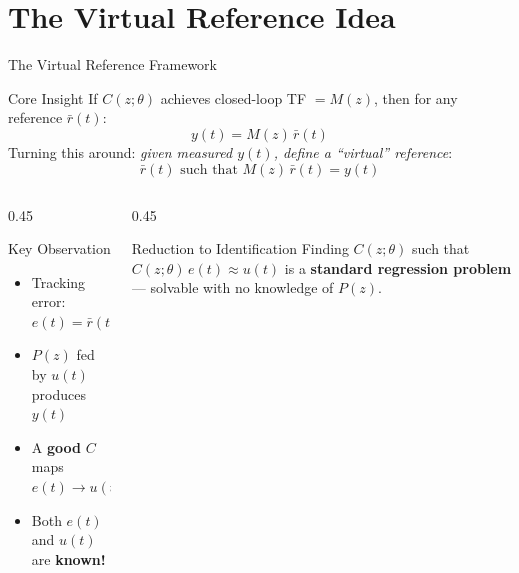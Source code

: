 \documentclass[hyperref={pdfpagemode=FullScreen},aspectratio=169]{beamer}
\newcommand{\highlight}[1]{{\color{accentgreen!70!black}\textbf{#1}}}
\begin{document}
\section{The Virtual Reference Idea}

\begin{frame}{The Virtual Reference Framework}
  \begin{block}{Core Insight}
    If $C(z;\theta)$ achieves closed-loop TF $= M(z)$, then for any reference $\bar{r}(t)$:
    \[
      y(t) = M(z)\,\bar{r}(t)
    \]
    Turning this around: \emph{given measured $y(t)$, define a ``virtual'' reference}:
    \[
      \bar{r}(t) \text{ such that } M(z)\,\bar{r}(t) = y(t)
    \]
  \end{block}


  \begin{columns}[T]
    \begin{column}{0.45\textwidth}
      \begin{exampleblock}{Key Observation}
        \begin{itemize}
          \item Tracking error: $e(t) = \bar{r}(t) - y(t)$
          \item $P(z)$ fed by $u(t)$ produces $y(t)$
          \item A \textbf{good} $C$ maps $e(t) \to u(t)$
          \item Both $e(t)$ and $u(t)$ are \highlight{known!}
        \end{itemize}
      \end{exampleblock}
    \end{column}
    \begin{column}{0.45\textwidth}
      \begin{alertblock}{Reduction to Identification}
        Finding $C(z;\theta)$ such that $\displaystyle C(z;\theta)\,e(t) \approx u(t)$
        is a \textbf{standard regression problem} --- solvable with no knowledge of $P(z)$.
      \end{alertblock}
    \end{column}
  \end{columns}
\end{frame}
\end{document}
